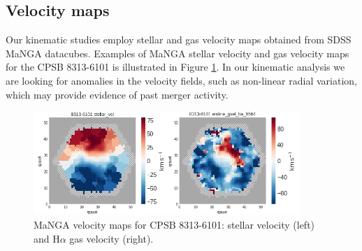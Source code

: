 \subsection{Velocity maps}
Our kinematic studies employ stellar and gas velocity maps obtained from SDSS MaNGA datacubes. Examples of MaNGA stellar velocity and gas velocity maps for the CPSB 8313-6101 is illustrated in Figure \ref{fig:CPSB-8313-6101-VMAPS}. In our kinematic analysis we are looking for anomalies in the velocity fields, such as non-linear radial variation, which may provide evidence of past merger activity.

\begin{figure}
    \centering
    \includegraphics[width=0.9\textwidth]{images/VelocityMaps/CPSB-8313-6101-VMAPS.png}
    \caption[MaNGA velocity maps for CPSB 8313-6101]{MaNGA velocity maps for CPSB 8313-6101: stellar velocity (left) and H$\alpha$ gas velocity (right).}
    \label{fig:CPSB-8313-6101-VMAPS}
\end{figure}



